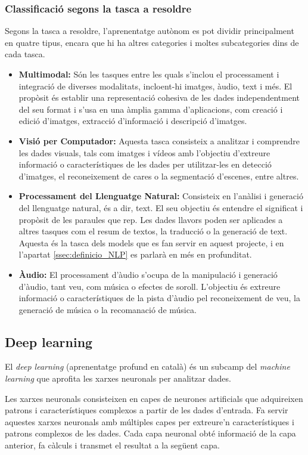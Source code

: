 \subsubsection{Classificació segons la tasca a resoldre}
Segons la tasca a resoldre, l'aprenentatge autònom es pot dividir principalment en quatre tipus, encara que hi ha altres categories i moltes subcategories dins de cada tasca. 
\begin{itemize}
    \item \textbf{Multimodal:} Són les tasques entre les quals s'inclou el processament i integració de diverses modalitats, incloent-hi imatges, àudio, text i més. El propòsit és establir una representació cohesiva de les dades independentment del seu format i s'usa en una àmplia gamma d'aplicacions, com creació i edició d'imatges, extracció d'informació i descripció d'imatges.
    \item \textbf{Visió per Computador:} Aquesta tasca consisteix a analitzar i comprendre les dades visuals, tals com imatges i vídeos amb l'objectiu d'extreure informació o característiques de les dades per utilitzar-les en detecció d'imatges, el reconeixement de cares o la segmentació d'escenes, entre altres.
    \item \textbf{Processament del Llenguatge Natural:} Consisteix en l'anàlisi i generació del llenguatge natural, és a dir, text. El seu objectiu és entendre el significat i propòsit de les paraules que rep. Les dades llavors poden ser aplicades a altres tasques com el resum de textos, la traducció o la generació de text. Aquesta és la tasca dels models que es fan servir en aquest projecte, i en l'apartat \ref{ssec:definicio_NLP} es parlarà en més en profunditat.
    \item \textbf{Àudio:} El processament d'àudio s'ocupa de la manipulació i generació d'àudio, tant veu, com música o efectes de soroll. L'objectiu és extreure informació o característiques de la pista d'àudio pel reconeixement de veu, la generació de música o la recomanació de música. 
\end{itemize}

\subsection{Deep learning}
El \textit{deep learning} (aprenentatge profund en català) és un subcamp del \textit{machine learning} que aprofita les xarxes neuronals per analitzar dades. 

Les xarxes neuronals consisteixen en capes de neurones artificials que adquireixen patrons i característiques complexos a partir de les dades d'entrada. Fa servir aquestes xarxes neuronals amb múltiples capes per extreure'n característiques i patrons complexos de les dades. Cada capa neuronal obté informació de la capa anterior, fa càlculs i transmet el resultat a la següent capa. 

